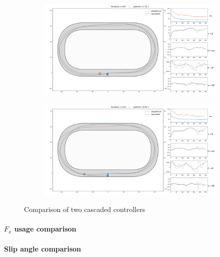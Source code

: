 \documentclass[a4paper, onecolumn, 12pt]{article}
\begin{document}
\begin{figure}[H]
    \centering
    \begin{subfigure}{\textwidth}
        \centering
        \includegraphics[width=\textwidth]{assets/race1_ippodromo.png}
    \end{subfigure}
    \begin{subfigure}{\textwidth} \label{singletrack_outside}
        \centering
        \includegraphics[width=\textwidth]{assets/race3_ippodromo.png}
    \end{subfigure}
    \caption[short]{Comparison of two cascaded controllers}
\end{figure}

\paragraph{$F_x$ usage comparison}

\paragraph{Slip angle comparison}
\end{document}
